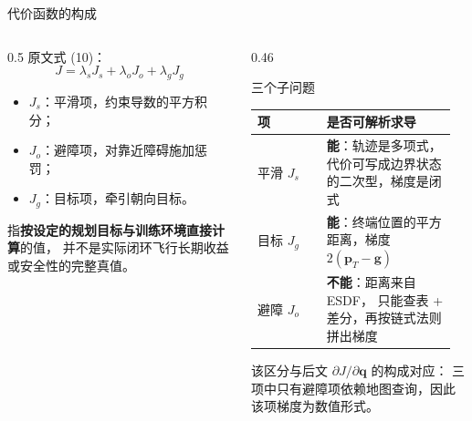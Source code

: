 \begin{frame}{代价函数的构成}
  \small
  \begin{columns}[t]
    \begin{column}{0.5\textwidth}
      原文式 (10)：
      \[
        J=\lambda_sJ_s+\lambda_oJ_o+\lambda_gJ_g
      \]
      \begin{itemize}\tight
        \item $J_s$：平滑项，约束导数的平方积分；
        \item $J_o$：避障项，对靠近障碍施加惩罚；
        \item $J_g$：目标项，牵引朝向目标。
      \end{itemize}
      \begin{reading}
        \small
        指\textbf{按设定的规划目标与训练环境直接计算}的值，
        并不是实际闭环飞行长期收益或安全性的完整真值。
      \end{reading}
    \end{column}
    \begin{column}{0.46\textwidth}
      \begin{block}{三个子问题}
        \footnotesize
        \begin{tabular}{@{}p{0.32\linewidth}p{0.6\linewidth}@{}}
          \toprule
          项 & 是否可解析求导 \\
          \midrule
          平滑 $J_s$ & \textbf{能}：轨迹是多项式，
                       代价可写成边界状态的二次型，梯度是闭式 \\
          \addlinespace
          目标 $J_g$ & \textbf{能}：终端位置的平方距离，梯度 $2(\mathbf p_T-\mathbf g)$ \\
          \addlinespace
          避障 $J_o$ & \textbf{不能}：距离来自 ESDF，
                       只能查表 + 差分，再按链式法则拼出梯度 \\
          \bottomrule
        \end{tabular}
      \end{block}
      \begin{reading}
        \scriptsize
        该区分与后文 $\partial J/\partial\mathbf q$ 的构成对应：
        三项中只有避障项依赖地图查询，因此该项梯度为数值形式。
      \end{reading}
    \end{column}
  \end{columns}
\end{frame}

